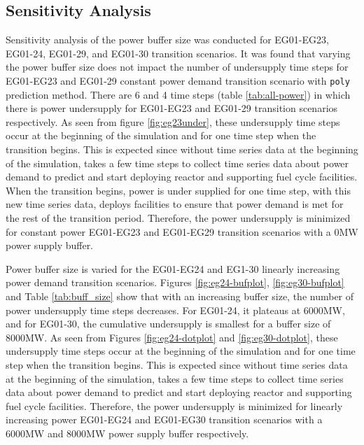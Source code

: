 \subsection{Sensitivity Analysis}
Sensitivity analysis of the power buffer size was conducted for 
EG01-EG23, EG01-24, EG01-29, and EG01-30 transition scenarios. 
It was found that varying the power buffer size does not 
impact the number of undersupply time steps for EG01-EG23 
and EG01-29 constant power demand transition scenario with 
\texttt{poly} prediction method. 
There are 6 and 4 time steps (table \ref{tab:all-power}) 
in which there is power undersupply for EG01-EG23 and EG01-29 
transition scenarios respectively. 
As seen from figure \ref{fig:eg23under}, these undersupply time 
steps occur at the beginning of the simulation and for one 
time step when the transition begins. 
This is expected since without time series data 
at the beginning of the simulation, \deploy takes a few 
time steps to collect time series data about power demand 
to predict and start deploying reactor and supporting 
fuel cycle facilities. 
When the transition begins, power is under supplied for one 
time step, with this new time series data, \deploy deploys 
facilities to ensure that power demand is met for the 
rest of the transition period. 
Therefore, the power undersupply is minimized for constant 
power EG01-EG23 and EG01-EG29 transition scenarios with 
a 0MW power supply buffer. 

Power buffer size is varied for the EG01-EG24 and EG1-30 
linearly increasing power demand transition scenarios. 
Figures \ref{fig:eg24-bufplot}, \ref{fig:eg30-bufplot} 
and Table \ref{tab:buff_size} 
show that with an increasing buffer size, the number of 
power undersupply time steps decreases. 
For EG01-24, it plateaus at 6000MW, and for EG01-30, 
the cumulative undersupply is smallest for a buffer 
size of 8000MW.  
As seen from Figures \ref{fig:eg24-dotplot} and 
\ref{fig:eg30-dotplot}, these undersupply time 
steps occur at the beginning of the simulation and for one 
time step when the transition begins. 
This is expected since without time series data 
at the beginning of the simulation, \deploy takes a few 
time steps to collect time series data about power demand 
to predict and start deploying reactor and supporting 
fuel cycle facilities. 
Therefore, the power undersupply is minimized for linearly 
increasing power EG01-EG24 and EG01-EG30 transition scenarios with 
a 6000MW and 8000MW power supply buffer respectively. 

